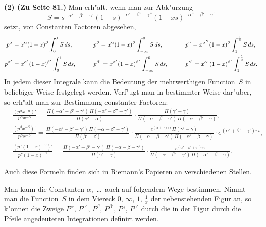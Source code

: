 \documentclass[12pt,a4paper]{article}
\begin{document}
\textbf{(2) (Zu Seite 81.)} Man erh"alt, wenn man zur Abk"urzung
\[
S = s^{-\alpha'-\beta'-\gamma'}(1-s)^{-\alpha'-\beta'-\gamma''}(1-xs)^{-\alpha''-\beta'-\gamma'}
\]
setzt, von Constanten Factoren abgesehen,
\[
\small
\begin{aligned}
p^\alpha &= x^\alpha(1-x)^\beta \int_0^1 S\,ds,\qquad
&&p^\beta = x^\alpha(1-x)^\beta \int_{-\infty}^0 S\,ds,\qquad
&&p^\gamma = x^{\alpha''}(1-x)^\beta \int_1^{\frac{1}{x}} S\,ds,\\
p^{\alpha'} &= x^{\alpha'}(1-x)^{\beta'} \int_0^1 S\,ds,\qquad
&&p^{\beta'} = x^{\alpha'}(1-x)^{\beta'} \int_{-\infty}^0 S\,ds,\qquad
&&p^{\gamma'} = x^{\alpha'}(1-x)^{\beta'} \int_1^{\frac{1}{x}} S\,ds.
\end{aligned}
\]
In jedem dieser Integrale kann die Bedeutung der mehrwerthigen
Function~$S$ in beliebiger Weise festgelegt werden. Verf"ugt man in
bestimmter Weise dar"uber, so erh"alt man zur Bestimmung constanter
Factoren:
\begingroup
\footnotesize
\begin{align*}
&\frac{(p^\alpha x^{-\alpha})'}{p^\alpha x^{-\alpha}} =
\frac{\Pi(-\alpha'-\beta'-\gamma')\,\Pi(-\alpha'-\beta''-\gamma')}
     {\Pi(\alpha' - \alpha)}
\cdot \frac{\Pi(\gamma' - \gamma)}
     {\Pi(-\alpha - \beta - \gamma')\,\Pi(-\alpha - \beta' - \gamma)},\\
&\frac{(p^\beta x^{-\beta})'}{p^\beta x^{-\beta}} =
\frac{\Pi(-\alpha'-\beta'-\gamma')\,\Pi(-\alpha - \beta' - \gamma')}
     {\Pi(\beta' - \beta)}
\cdot \frac{e^{(\alpha+\gamma)\pi i}\,\Pi(\gamma' - \gamma)}
     {\Pi(-\alpha - \beta - \gamma')\,\Pi(-\alpha' - \beta - \gamma)}
\cdot e^{(\alpha'+\beta'+\gamma')\pi i},\\
&\frac{(p^\gamma(1-x)^{-\gamma})'}{p^\gamma(1-x)^{-\gamma}} =
\frac{\Pi(-\alpha'-\beta'-\gamma')\,\Pi(-\alpha - \beta - \gamma')}
     {\Pi(\gamma' - \gamma)}
\cdot \frac{e^{(\alpha'+\beta'+\gamma')\pi i}}
     {\Pi(-\alpha - \beta' - \gamma')\,\Pi(-\alpha' - \beta - \gamma)}.
\end{align*}
\endgroup

Auch diese Formeln finden sich in Riemann's Papieren an verschiedenen
Stellen.

Man kann die Constanten $\alpha$,\ \ldots\ auch auf folgendem Wege bestimmen.
Nimmt man die Function~$S$ in dem Viereck $0$, $\infty$, $1$, $\frac{1}{x}$ der
nebenstehenden Figur an, so k"onnen die Zweige $P^\alpha$, $P^{\alpha'}$,
$P^\beta$, $P^{\beta'}$, $P^\gamma$, $P^{\gamma'}$ durch die in der Figur durch
die Pfeile angedeuteten Integrationen definirt werden.
\end{document}
